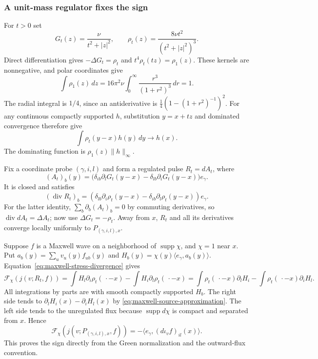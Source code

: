 \subsubsection{A unit-mass regulator fixes the sign}
For $t>0$ set
\[
 G_t(z)=\frac{\nu}{t^2+|z|^2},\qquad
 \rho_t(z)=\frac{8\nu t^2}{(t^2+|z|^2)^3}.
\]
Direct differentiation gives $-\Delta G_t=\rho_t$ and
$t^4\rho_t(tz)=\rho_1(z)$. These kernels are nonnegative, and polar
coordinates give
\[
 \int\rho_1(z)\,dz
 =16\pi^2\nu\int_0^\infty\frac{r^3}{(1+r^2)^3}\,dr=1.
\]
The radial integral is $1/4$, since an antiderivative is
$\tfrac14(1-(1+r^2)^{-1})^2$. For any continuous compactly supported
$h$, substitution $y=x+tz$ and dominated convergence therefore give
\begin{equation}\label{eq:maxwell-source-approximation}
              \int\rho_t(y-x)h(y)\,dy\longrightarrow h(x).
\end{equation}
The dominating function is $\rho_1(z)\|h\|_\infty$.

Fix a coordinate probe $(\gamma,i,l)$ and form a regulated pulse $R_t=dA_t$,
where
\[
 (A_t)_b(y)=\bigl(\delta_{ib}\partial_lG_t(y-x)
                    -\delta_{lb}\partial_iG_t(y-x)\bigr)e_\gamma.
\]
It is closed and satisfies
\[
 (\operatorname{div}R_t)_b
       =(\delta_{lb}\partial_i\rho_t(y-x)
                    -\delta_{ib}\partial_l\rho_t(y-x))e_\gamma.
\]
For the latter identity, $\sum_b\partial_b(A_t)_b=0$ by commuting
derivatives, so $\operatorname{div}dA_t=\Delta A_t$; now use
$\Delta G_t=-\rho_t$. Away from $x$, $R_t$ and all its derivatives
converge locally uniformly to $P_{(\gamma,i,l),x}$.

Suppose $f$ is a Maxwell wave on a neighborhood of
$\operatorname{supp}\chi$, and $\chi=1$ near $x$. Put
$a_b(y)=\sum_uv_u(y)f_{ub}(y)$ and
$H_b(y)=\chi(y)\langle e_\gamma,a_b(y)\rangle$.
Equation~\eqref{eq:maxwell-stress-divergence} gives
\[
 \mathcal F_\chi(j(v;R_t,f))
 =\int H_l\partial_i\rho_t(\,\cdot-x)
       -\int H_i\partial_l\rho_t(\,\cdot-x)
 =\int\rho_t(\,\cdot-x)\partial_lH_i
       -\int\rho_t(\,\cdot-x)\partial_iH_l.
\]
All integrations by parts are with smooth compactly supported $H_b$.
The right side tends to $\partial_lH_i(x)-\partial_iH_l(x)$ by
\eqref{eq:maxwell-source-approximation}. The left side tends to the
unregulated flux because $\operatorname{supp}d\chi$ is compact and
separated from $x$. Hence
\begin{equation}\label{eq:maxwell-coordinate-charge}
 \mathcal F_\chi(j(v;P_{(\gamma,i,l),x},f))
                       =-\langle e_\gamma,(d\iota_v f)_{il}(x)\rangle.
\end{equation}
This proves the sign directly from the Green normalization and the
outward-flux convention.

